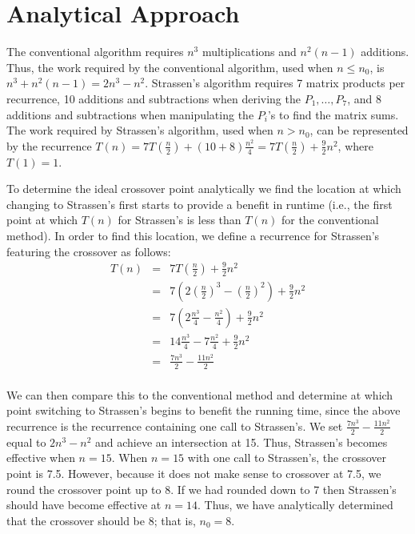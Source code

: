 \documentclass[solution, letterpaper]{cs121}
\begin{document}

\section*{Analytical Approach}

\hspace{4mm} The conventional algorithm requires $n^3$ multiplications and $n^2(n-1)$ additions. Thus, the work required by the conventional algorithm, used when $n \leq n_0$, is $n^3 + n^2(n-1) = 2n^3 - n^2$. Strassen's algorithm requires 7 matrix products per recurrence, 10 additions and subtractions when deriving the $P_1, \ldots, P_7$, and 8 additions and subtractions when manipulating the $P_i$'s to find the matrix sums. The work required by Strassen's algorithm, used when $n > n_0$, can be represented by the recurrence $T(n) = 7T(\frac{n}{2}) + (10+8)\frac{n^2}{4} = 7T(\frac{n}{2}) + \frac{9}{2}n^2$, where $T(1) = 1$.

To determine the ideal crossover point analytically we find the location at which changing to Strassen's first starts to provide a benefit in runtime (i.e., the first point at which $T(n)$ for Strassen's is less than $T(n)$ for the conventional method). In order to find this location, we define a recurrence for Strassen's featuring the crossover as follows:
\[
\begin{array}{rcl}
T(n) &=& 7T(\frac{n}{2}) + \frac{9}{2}n^2\\
&=& 7(2(\frac{n}{2})^3 - (\frac{n}{2})^2) + \frac{9}{2}n^2\\
&=& 7(2\frac{n^3}{4} - \frac{n^2}{4}) + \frac{9}{2}n^2\\
&=& 14\frac{n^3}{4} - 7\frac{n^2}{4} + \frac{9}{2}n^2\\
&=& \frac{7n^3}{2} - \frac{11n^2}{2}\\
\end{array}
\]

We can then compare this to the conventional method and determine at which point switching to Strassen's begins to benefit the running time, since the above recurrence is the recurrence containing one call to Strassen's. We set $\frac{7n^3}{2} - \frac{11n^2}{2}$ equal to $2n^3 - n^2$ and achieve an intersection at 15. Thus, Strassen's becomes effective when $n = 15$. When $n=15$ with one call to Strassen's, the crossover point is 7.5. However, because it does not make sense to crossover at 7.5, we round the crossover point up to 8. If we had rounded down to 7 then Strassen's should have become effective at $n = 14$. Thus, we have analytically determined that the crossover should be 8; that is, $n_0 = 8$.
\end{document}
